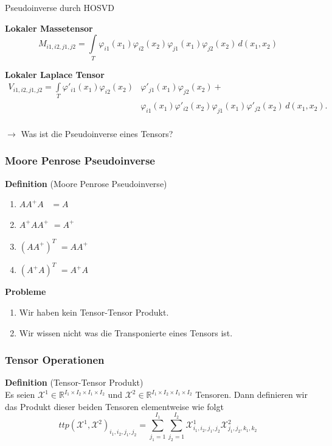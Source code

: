 \begin{frame}[plain]
\Huge{Pseudoinverse durch HOSVD}
\end{frame}
\begin{frame}

\textbf{Lokaler Massetensor}
\begin{equation*} 
M_{i1,i2,j1,j2} = \int\limits_{T} \varphi_{i1} (x_1) \varphi_{i2}(x_2) \varphi_{j1} (x_1) \varphi_{j2} (x_2) \, d(x_1,x_2)
\end{equation*}

\textbf{Lokaler Laplace Tensor}
\begin{equation*} 
\begin{aligned}
V_{i1,i2,j1,j2} = \int\limits_{T} \varphi'_{i1} (x_1) \varphi_{i2}(x_2) &\varphi'_{j1} (x_1) \varphi_{j2} (x_2) + \\
&\varphi_{i1} (x_1) \varphi'_{i2}(x_2) \varphi_{j1} (x_1) \varphi'_{j2} (x_2) \, d(x_1,x_2).
\end{aligned}
\end{equation*} \\
$\rightarrow$ Was ist die Pseudoinverse eines Tensors?
\end{frame}

\begin{frame}
\frametitle{Moore Penrose Pseudoinverse}
\begin{framed}
\textbf{Definition} (Moore Penrose Pseudoinverse) 
\begin{enumerate}
\item $AA^{+}A \, \, \, \, \,  =A$
\item $A^{+}AA^{+} \, \, =A^{+}$ 
\item $(AA^{+})^{T} \, \,  =AA^{+}$
\item $(A^{+}A)^{T} \, \, =A^{+}A$ 
\end{enumerate}
\end{framed}
\textbf{Probleme}
\begin{enumerate}
\item Wir haben kein Tensor-Tensor Produkt.
\item Wir wissen nicht was die Transponierte eines Tensors ist.
\end{enumerate}
\end{frame}

\begin{frame}
\frametitle{Tensor Operationen}
\begin{framed} \textbf{Definition} (Tensor-Tensor Produkt) \\
Es seien $\pmb{\mathcal{X}}^1  \in \mathbb{R}^{I_1 \times I_2 \times I_1 \times I_2}$ und $\pmb{\mathcal{X}}^2 \in \mathbb{R}^{I_1 \times I_2 \times I_1 \times I_2}$ Tensoren.
Dann definieren wir das Produkt dieser beiden Tensoren elementweise wie folgt
\begin{equation}
ttp(\pmb{\mathcal{X}}^1,\pmb{\mathcal{X}}^2)_{i_1,i_2,j_1,j_2}= \sum_{j_1=1}^{I_1} \sum_{j_2=1}^{I_2} \pmb{\mathcal{X}}^1_{i_1,i_2,j_1,j_2} \pmb{\mathcal{X}}^2_{j_1,j_2,k_1,k_2} 
\end{equation}
\end{framed}
\end{frame}

